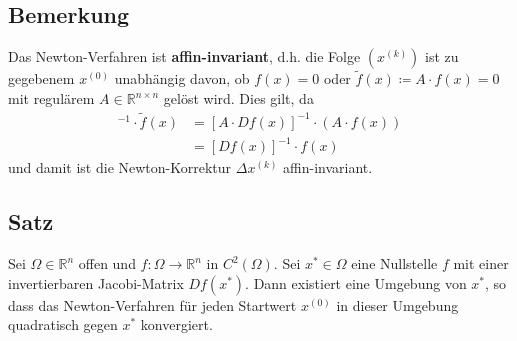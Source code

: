 \documentclass[ngerman,fontsize=11pt, paper=a4, parskip=half, titlepage=true, toc=bib]{scrbook}
\newcommand{\R}{\mathds{R}}
\newcommand{\Ren}{\mathds{R}^{n}}
\newcommand{\Renn}{\mathds{R}^{n\times n}}
\begin{document}
  
  \subsection{Bemerkung}\label{5.5.5}
  Das Newton-Verfahren ist \textbf{affin-invariant},
  d.h. die Folge $(x^{(k)})$ ist zu gegebenem $x^{(0)}$ unabhängig davon,
  ob $f(x)=0$ oder $\widetilde{f}(x)\coloneqq A\cdot f(x) =0$
  mit regulärem $A\in \Renn $ gelöst wird.
  Dies gilt, da 
  \begin{align*}
    [D\widetilde{f}(x)]^{-1} \cdot \widetilde{f}(x)
    &= [A\cdot Df(x)]^{-1} \cdot (A\cdot f(x))\\
    &= [Df(x)]^{-1} \cdot f(x)
  \end{align*}
  und damit ist die Newton-Korrektur $\Delta x^{(k)}$ affin-invariant.
  
  \subsection{Satz}
  Sei $\Omega\in\R^n$ offen und $f:\Omega\rightarrow\Ren$ in $C^2(\Omega)$.
  Sei $x^{*}\in\Omega $ eine Nullstelle $f$ mit einer invertierbaren Jacobi-Matrix $Df(x^{*})$.
  Dann existiert eine Umgebung von $x^{*}$, so dass das Newton-Verfahren 
  für jeden Startwert $x^{(0)}$ in dieser Umgebung
  quadratisch gegen $x^{*}$ konvergiert.
  
\end{document}
